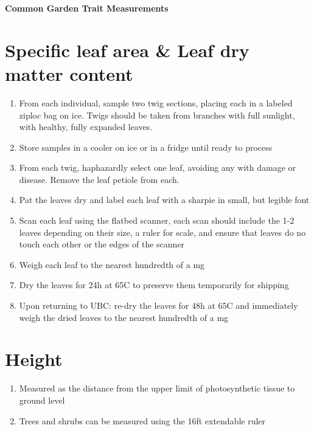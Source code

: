 \documentclass[11pt,letter]{article}
\begin{document}
{\bf \Large Common Garden Trait Measurements}\\

\section{Specific leaf area \& Leaf dry matter content}
\begin{enumerate}
\item From each individual, sample two twig sections, placing each in a labeled ziploc bag on ice. Twigs should be taken from branches with full sunlight, with healthy, fully expanded leaves.
\item Store samples in a cooler on ice or in a fridge until ready to process 
\item From each twig, haphazardly select one leaf, avoiding any with damage or disease. Remove the leaf petiole from each.
\item Pat the leaves dry and label each leaf with a sharpie in small, but legible font
\item Scan each leaf using the flatbed scanner, each scan should include the 1-2 leaves depending on their size, a ruler for scale, and ensure that leaves do no touch each other or the edges of the scanner
\item Weigh each leaf to the nearest hundredth of a mg
\item Dry the leaves for 24h at 65C to preserve them temporarily for shipping
\item Upon returning to UBC: re-dry the leaves for 48h at 65C and immediately weigh the dried leaves to the nearest hundredth of a mg
\end{enumerate}

\section{Height}
\begin{enumerate}
\item Measured as the distance from the upper limit of photosynthetic tissue to ground level
\item Trees and shrubs can be measured using the 16ft extendable ruler
\end{enumerate}
\end{document}
